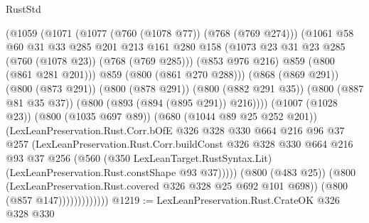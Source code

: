 \begin{lexlean}{RustStd}
\begin{coremodule}
                              (@1059
                                (@1071
                                  (@1077 (@760 (@1078 @77)) (@768 (@769 @274)))
                                  (@1061
                                    @58
                                    @60
                                    @31
                                    @33
                                    @285
                                    @201
                                    @213
                                    @161
                                    @280
                                    @158
                                    (@1073 @23 @31 @23 @285 (@760 (@1078 @23)) (@768 (@769 @285)))
                                    (@853 @976 @216)
                                    @859
                                    (@800 (@861 @281 @201)))
                                  @859
                                  (@800 (@861 @270 @288)))
                                (@868 (@869 @291))
                                (@800 (@873 @291))
                                (@800 (@878 @291))
                                (@800 (@882 @291 @35))
                                (@800 (@887 @81 @35 @37))
                                (@800 (@893 (@894 (@895 @291)) @216))))
                            (@1007 (@1028 @23))
                            (@800 (@1035 @697 @89))
                            (@680 (@1044 @89 @25 @252 @201))
                            (LexLeanPreservation.Rust.Corr.bOfE
                              @326
                              @328
                              @330
                              @664
                              @216
                              @96
                              @37
                              @257
                              (LexLeanPreservation.Rust.Corr.buildConst
                                @326
                                @328
                                @330
                                @664
                                @216
                                @93
                                @37
                                @256
                                (@560
                                  (@350 LexLeanTarget.RustSyntax.Lit)
                                  (LexLeanPreservation.Rust.constShape @93 @37)))))
                          (@800 (@483 @25))
                          (@800 (LexLeanPreservation.Rust.covered @326 @328 @25 @692 @101 @698))
                          (@800 (@857 @147)))))))))))))
@1219 := LexLeanPreservation.Rust.CrateOK @326 @328 @330

\end{coremodule}
\end{lexlean}

